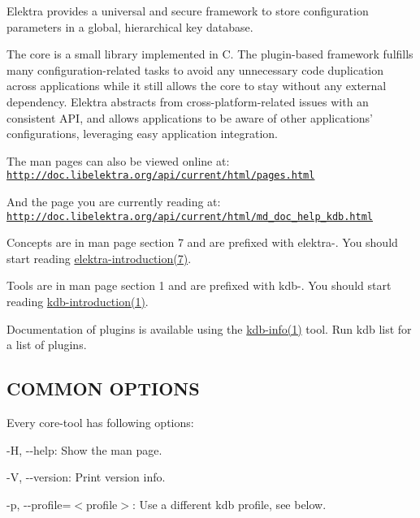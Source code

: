Elektra provides a universal and secure framework to store configuration parameters in a global, hierarchical key database.

The core is a small library implemented in C. The plugin-\/based framework fulfills many configuration-\/related tasks to avoid any unnecessary code duplication across applications while it still allows the core to stay without any external dependency. Elektra abstracts from cross-\/platform-\/related issues with an consistent A\+P\+I, and allows applications to be aware of other applications' configurations, leveraging easy application integration.

The man pages can also be viewed online at\+: \href{http://doc.libelektra.org/api/current/html/pages.html}{\tt http\+://doc.\+libelektra.\+org/api/current/html/pages.\+html}

And the page you are currently reading at\+: \href{http://doc.libelektra.org/api/current/html/md_doc_help_kdb.html}{\tt http\+://doc.\+libelektra.\+org/api/current/html/md\+\_\+doc\+\_\+help\+\_\+kdb.\+html}

Concepts are in man page section 7 and are prefixed with {\ttfamily elektra-\/}. You should start reading \hyperlink{md_doc_help_elektra-introduction_doc_help_elektra-introduction_md}{elektra-\/introduction(7)}.

Tools are in man page section 1 and are prefixed with {\ttfamily kdb-\/}. You should start reading \hyperlink{doc_help_kdb-introduction_md}{kdb-\/introduction(1)}.

Documentation of plugins is available using the \hyperlink{md_doc_help_kdb-info_doc_help_kdb-info_md}{kdb-\/info(1)} tool. Run {\ttfamily kdb list} for a list of plugins.

\subsection*{C\+O\+M\+M\+O\+N O\+P\+T\+I\+O\+N\+S}

Every core-\/tool has following options\+:


\begin{DoxyItemize}
\item {\ttfamily -\/\+H}, {\ttfamily -\/-\/help}\+: Show the man page.
\item {\ttfamily -\/\+V}, {\ttfamily -\/-\/version}\+: Print version info.
\item {\ttfamily -\/p}, {\ttfamily -\/-\/profile}=$<$profile$>$\+: Use a different kdb profile, see below.
\end{DoxyItemize}

